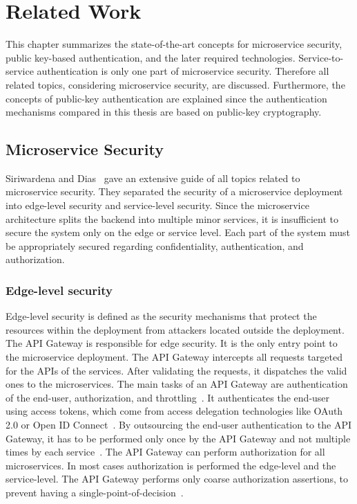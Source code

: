 \chapter{Related Work}
\label{cha:Related_Work}
This chapter summarizes the state-of-the-art concepts for microservice security, public key-based authentication, and the later required technologies.
Service-to-service authentication is only one part of microservice security.
Therefore all related topics, considering microservice security, are discussed.
Furthermore, the concepts of public-key authentication are explained since the authentication mechanisms compared in this thesis are based on public-key cryptography.

\section{Microservice Security}
Siriwardena and Dias~\cite{dias2020microservices} gave an extensive guide of all topics related to microservice security. 
They separated the security of a microservice deployment into edge-level security and service-level security.
Since the microservice architecture splits the backend into multiple minor services, it is insufficient to secure the system only on the edge or service level.
Each part of the system must be appropriately secured regarding confidentiality, authentication, and authorization.

\subsection{Edge-level security}
Edge-level security is defined as the security mechanisms that protect the resources within the deployment from attackers located outside the deployment. 
The API Gateway is responsible for edge security.
It is the only entry point to the microservice deployment.
The API Gateway intercepts all requests targeted for the APIs of the services.
After validating the requests, it dispatches the valid ones to the microservices.
The main tasks of an API Gateway are authentication of the end-user, authorization, and throttling~\cite{dias2020microservices}.
It authenticates the end-user using access tokens, which come from access delegation technologies like OAuth 2.0 or Open ID Connect~\cite{siriwardena2014advanced}.
By outsourcing the end-user authentication to the API Gateway, it has to be performed only once by the API Gateway and not multiple times by each service~\cite{dias2020microservices}.
The API Gateway can perform authorization for all microservices. 
In most cases authorization is performed the edge-level and the service-level. 
The API Gateway performs only coarse authorization assertions, to prevent having a single-point-of-decision~\cite{barabanov2020authentication}.

